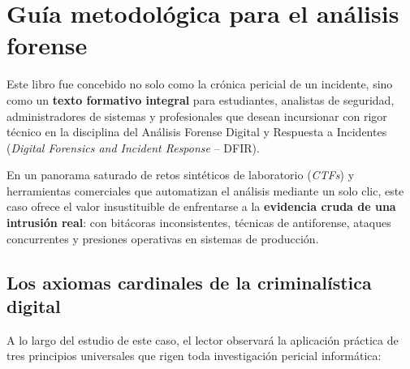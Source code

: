 \chapter*{Guía metodológica para el análisis forense}

Este libro fue concebido no solo como la crónica pericial de un incidente, sino como un \textbf{texto formativo integral} para estudiantes, analistas de seguridad, administradores de sistemas y profesionales que desean incursionar con rigor técnico en la disciplina del Análisis Forense Digital y Respuesta a Incidentes (\textit{Digital Forensics and Incident Response} -- DFIR).

En un panorama saturado de retos sintéticos de laboratorio (\textit{CTFs}) y herramientas comerciales que automatizan el análisis mediante un solo clic, este caso ofrece el valor insustituible de enfrentarse a la \textbf{evidencia cruda de una intrusión real}: con bitácoras inconsistentes, técnicas de antiforense, ataques concurrentes y presiones operativas en sistemas de producción.

\section*{Los axiomas cardinales de la criminalística digital}

A lo largo del estudio de este caso, el lector observará la aplicación práctica de tres principios universales que rigen toda investigación pericial informática:

